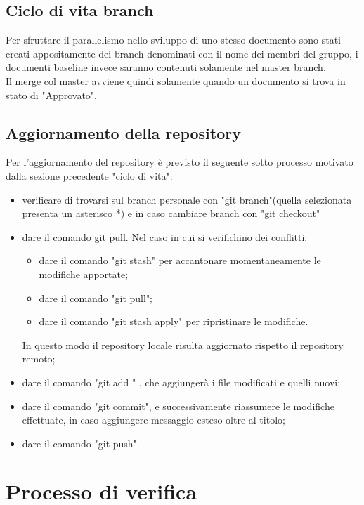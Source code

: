 \documentclass[NormeDiProgetto.tex]{subfiles}
\begin{document}
	\subsection{Ciclo di vita branch}
	Per sfruttare il parallelismo nello sviluppo di uno stesso documento sono stati creati appositamente dei branch denominati con il nome dei membri del gruppo, i documenti baseline invece saranno contenuti solamente nel master branch.\\
	Il merge col master avviene quindi solamente quando un documento si trova in stato di "Approvato".
	
	\subsection{Aggiornamento della repository}
	Per l’aggiornamento del repository è previsto il seguente sotto processo motivato dalla sezione precedente "ciclo di vita":
	\begin{itemize}
		\item verificare di trovarsi sul branch personale con "git branch"(quella selezionata presenta un asterisco *) e in caso cambiare branch con "git checkout"
		\item dare il comando git pull. Nel caso in cui si verifichino dei conflitti:
		\begin{itemize}
			\item dare il comando "git stash" per accantonare momentaneamente	le modifiche apportate;
			\item dare il comando "git pull";
			\item dare il comando "git stash apply" per ripristinare le modifiche.
		\end{itemize}	In questo modo il repository locale risulta aggiornato rispetto il repository remoto;
	
		\item dare il comando "git add \textasteriskcentered" , che aggiungerà i file modificati e quelli nuovi;
		\item dare il comando "git commit", e successivamente riassumere le modifiche effettuate, in caso aggiungere messaggio esteso oltre al titolo;
		\item dare il comando "git push".
	\end{itemize}
	
	\section{Processo di verifica}
	
\end{document}
